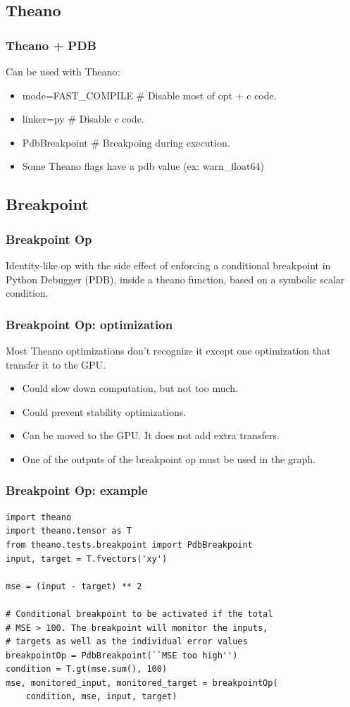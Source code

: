 \documentclass[utf8x,xcolor=pdftex,dvipsnames,table]{beamer}
\begin{document}
\subsection{Theano}
\begin{frame}
  \frametitle{Theano + PDB}
  Can be used with Theano:
  \begin{itemize}
    \item mode=FAST\_COMPILE \# Disable most of opt + c code.
    \item linker=py \# Disable c code.
    \item PdbBreakpoint \# Breakpoing during execution.
    \item Some Theano flags have a pdb value (ex: warn\_float64)
  \end{itemize}
\end{frame}



\subsection{Breakpoint}
\begin{frame}[fragile]
  \frametitle{Breakpoint Op} Identity-like op with the side effect of
  enforcing a conditional breakpoint in Python Debugger (PDB), inside a theano function, based
  on a symbolic scalar condition.
\end{frame}

\begin{frame}[fragile]
  \frametitle{Breakpoint Op: optimization}
 Most Theano optimizations don't recognize it except one
 optimization that transfer it to the GPU.
\begin{itemize}
  \item Could slow down computation, but not too much.
  \item Could prevent stability optimizations.
  \item Can be moved to the GPU. It does not add extra transfers.
  \item One of the outputs of the breakpoint op must be used in the graph.
\end{itemize}
\end{frame}

\begin{frame}[fragile]
  \frametitle{Breakpoint Op: example}
\begin{lstlisting}
import theano
import theano.tensor as T
from theano.tests.breakpoint import PdbBreakpoint
input, target = T.fvectors('xy')

mse = (input - target) ** 2

# Conditional breakpoint to be activated if the total
# MSE > 100. The breakpoint will monitor the inputs,
# targets as well as the individual error values
breakpointOp = PdbBreakpoint(``MSE too high'')
condition = T.gt(mse.sum(), 100)
mse, monitored_input, monitored_target = breakpointOp(
    condition, mse, input, target)
\end{lstlisting}
\end{frame}
\end{document}
